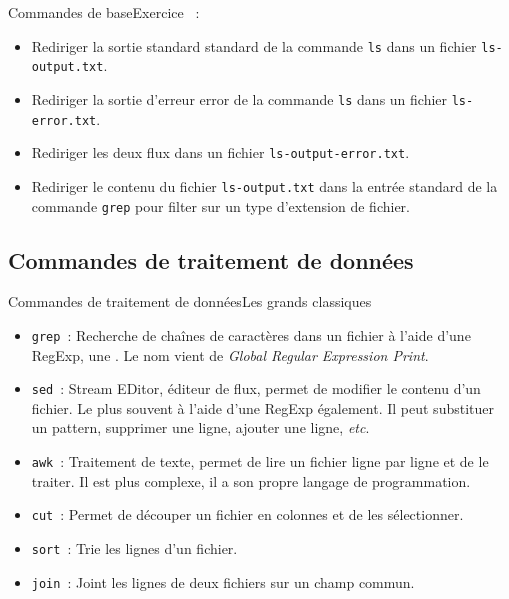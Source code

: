 \documentclass{beamer}
\begin{document}
    \begin{frame}{Commandes de base}{Exercice \execcounterdispinc{}~:}
        \begin{itemize}
            \item Rediriger la sortie standard standard de la commande \lstinline{ls} dans un fichier \lstinline{ls-output.txt}.
            \item Rediriger la sortie d'erreur error de la commande \lstinline{ls} dans un fichier \lstinline{ls-error.txt}.
            \item Rediriger les deux flux dans un fichier \lstinline{ls-output-error.txt}.
            \item Rediriger le contenu du fichier \lstinline{ls-output.txt} dans la entrée standard de la commande \lstinline{grep} pour filter sur un type d'extension de fichier.
        \end{itemize}
    \end{frame}

    \subsection{Commandes de traitement de données}\label{subsec:commandes-donnees}

    \begin{frame}{Commandes de traitement de données}{Les grands classiques}
        \begin{itemize}
            \item \lstinline{grep}~: Recherche de chaînes de caractères dans un fichier à l'aide d'une RegExp, une .
            Le nom vient de \textit{Global Regular Expression Print}.
            \item \lstinline{sed}~: Stream EDitor, éditeur de flux, permet de modifier le contenu d'un fichier.
            Le plus souvent à l'aide d'une RegExp également.
            Il peut substituer un pattern, supprimer une ligne, ajouter une ligne, \textit{etc}.
            \item \lstinline{awk}~: Traitement de texte, permet de lire un fichier ligne par ligne et de le traiter.
            Il est plus complexe, il a son propre langage de programmation.
            \item \lstinline{cut}~: Permet de découper un fichier en colonnes et de les sélectionner.
            \item \lstinline{sort}~: Trie les lignes d'un fichier.
            \item \lstinline{join}~: Joint les lignes de deux fichiers sur un champ commun.
        \end{itemize}
    \end{frame}
\end{document}
